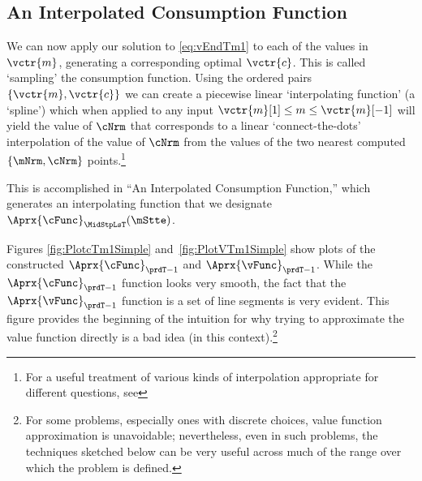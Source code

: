 \documentclass[\econtexRoot/SolvingMicroDSOPs]{subfiles}
\begin{document}


\hypertarget{an-interpolated-consumption-function}{}
\subsection{An Interpolated Consumption Function} \label{subsec:LinInterp}

We can now apply our solution to \eqref{eq:vEndTm1} to each of the values in $\vctr{m}$, generating a corresponding optimal $\vctr{c}$.  This is called `sampling' the consumption function.  Using the ordered pairs $\{\vctr{m},\vctr{c}\}$ we can create a piecewise linear `interpolating function' (a `spline') which when applied to any input $\vctr{m}[1] \leq  m\leq \vctr{m}[-1]$ will yield the value of $\cNrm$ that corresponds to a linear `connect-the-dots' interpolation of the value of $\cNrm$ from the values of the two nearest computed $\{\mNrm,\cNrm\}$ points.\footnote{For a useful treatment of various kinds of interpolation appropriate for different questions, see } %

This is accomplished in ``An Interpolated Consumption Function,'' which generates an interpolating function that we designate $\Aprx{\cFunc}_{\MidStpLsT}(\mStte)$. %

Figures \ref{fig:PlotcTm1Simple} and~\ref{fig:PlotVTm1Simple} show
plots of the constructed $\Aprx{\cFunc}_{\prdT-1}$ and $\Aprx{\vFunc}_{\prdT-1}$. While the $\Aprx{\cFunc}_{\prdT-1}$ function looks very smooth, the fact that the $\Aprx{\vFunc}_{\prdT-1}$ function is a set of line segments is very evident.  This figure provides the beginning of the intuition for why trying to approximate the value function directly is a bad idea (in this context).\footnote{For some problems, especially ones with discrete choices, value function approximation is unavoidable; nevertheless, even in such problems, the techniques sketched below can be very useful across much of the range over which the problem is defined.}
\end{document}
